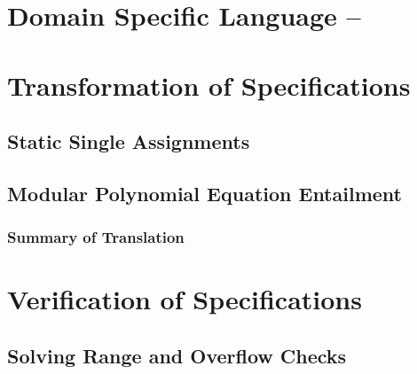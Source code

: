 \documentclass[sigconf, anonymous]{acmart}
\begin{document}
\section{Domain Specific Language -- \bvdsl}
\label{section:domain-specific-language-bvdsl}



\section{Transformation of Specifications}
\label{section:translation}


\subsection{Static Single Assignments}
\label{subsection:translation:static-single-assignment}


\subsection{\zdsl}
\label{subsection:domain-specific-language-zdsl}


%

\subsection{Modular Polynomial Equation Entailment}
\label{subsection:translation:multivariant-polynomial-equations}


\subsubsection*{Summary of Translation}



\section{Verification of Specifications}
\label{section:verification-of-specifications}


\subsection{Solving Range and Overflow Checks}
\label{subsection:solving-range-overflow-checks}

\end{document}
